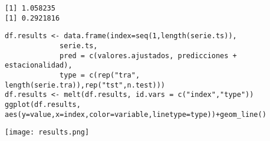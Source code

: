 \documentclass[11pt]{article}
\begin{document}
\begin{verbatim}
[1] 1.058235
[1] 0.2921816
\end{verbatim}

\begin{verbatim}
df.results <- data.frame(index=seq(1,length(serie.ts)),
			 serie.ts,
			 pred = c(valores.ajustados, predicciones + estacionalidad),
			 type = c(rep("tra", length(serie.tra)),rep("tst",n.test)))
df.results <- melt(df.results, id.vars = c("index","type"))
ggplot(df.results, aes(y=value,x=index,color=variable,linetype=type))+geom_line()
\end{verbatim}

\begin{center}
\texttt{[image: results.png]}
\end{center}
\end{document}
